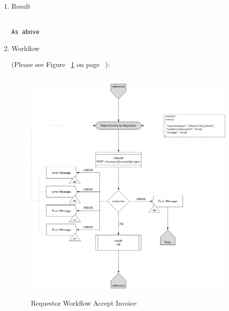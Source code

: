 \begin{enumerate}
\begin{table}[H]
\begin{center}
\begin{tabular}{|c|l|}
\end{tabular}
\end{center}

\end{table}

\item Result

\begin{tcolorbox}[boxrule=0pt, frame empty]
\begin{verbatim}

As above

\end{verbatim}
\end{tcolorbox}


\item Workflow

(Please see Figure ~\ref{fig:RRI} on page ~\pageref{fig:RRI}):

\begin{figure}[htbp]
    \centering
    \includegraphics[width=12cm,height=12cm,angle=0]{./diag/Workflow/Payment/RejectInvoice-R-Workflow.png}
    \caption{Requestor Workflow Accept Invoice }
	\label{fig:RRI}
\end{figure}


\end{enumerate}

